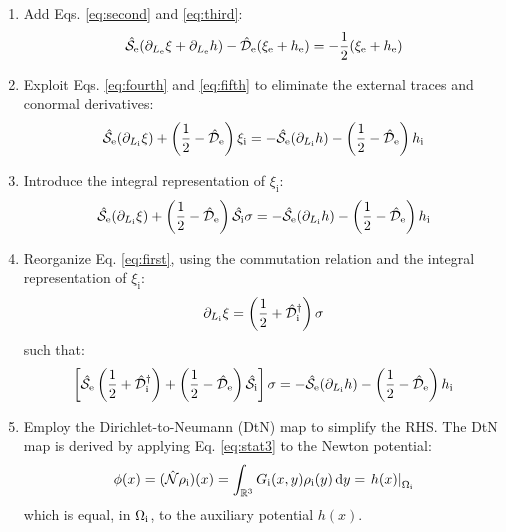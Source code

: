 \begin{enumerate}
  \item Add Eqs. \eqref{eq:second} and \eqref{eq:third}:
    \begin{equation}
    \hat{\mathcal{S}}_\mathrm{e}(\partial_{L_\mathrm{e}} \xi + \partial_{L_\mathrm{e}} h) -
    \hat{\mathcal{D}}_\mathrm{e}(\xi_\mathrm{e} + h_\mathrm{e})
    = -\frac{1}{2}(\xi_\mathrm{e} + h_\mathrm{e})
    \end{equation}
  \item Exploit Eqs. \eqref{eq:fourth} and \eqref{eq:fifth} to
    eliminate the external traces and conormal derivatives:
    \begin{equation}
      \hat{\mathcal{S}}_\mathrm{e}(\partial_{L_\mathrm{i}} \xi) + \left(\frac{1}{2} -
      \hat{\mathcal{D}}_\mathrm{e}\right)\xi_\mathrm{i} =
      - \hat{\mathcal{S}}_\mathrm{e}(\partial_{L_\mathrm{i}} h) - \left(\frac{1}{2} -
      \hat{\mathcal{D}}_\mathrm{e}\right)h_\mathrm{i}
    \end{equation}
  \item Introduce the integral representation of
    $\xi_\mathrm{i}$:
    \begin{equation}
      \hat{\mathcal{S}}_\mathrm{e}(\partial_{L_\mathrm{i}} \xi) + \left(\frac{1}{2} -
      \hat{\mathcal{D}}_\mathrm{e}\right)\hat{\mathcal{S}}_\mathrm{i}\sigma =
      - \hat{\mathcal{S}}_\mathrm{e}(\partial_{L_\mathrm{i}} h) - \left(\frac{1}{2} -
      \hat{\mathcal{D}}_\mathrm{e}\right)h_\mathrm{i}
    \end{equation}
  \item Reorganize Eq. \eqref{eq:first}, using the commutation
    relation and the integral representation of $\xi_\mathrm{i}$:
    \begin{equation}
    \partial_{L_\mathrm{i}} \xi = \left(\frac{1}{2} + \hat{\mathcal{D}}^\dagger_\mathrm{i}\right)\sigma
    \end{equation}
    such that:
    \begin{equation}
      \left[ \hat{\mathcal{S}}_\mathrm{e}\left(\frac{1}{2} + \hat{\mathcal{D}}^\dagger_\mathrm{i}\right)
      +
      \left(\frac{1}{2} - \hat{\mathcal{D}}_\mathrm{e}\right)\hat{\mathcal{S}}_\mathrm{i}
      \right]\sigma =
      - \hat{\mathcal{S}}_\mathrm{e}(\partial_{L_\mathrm{i}} h) - \left(\frac{1}{2} -
      \hat{\mathcal{D}}_\mathrm{e}\right)h_\mathrm{i}
    \end{equation}
  \item Employ the Dirichlet-to-Neumann (DtN) map to simplify
    the RHS. The DtN map is derived by applying Eq. \eqref{eq:stat3} to
    the Newton potential:
    \begin{equation}
      \phi(x) = (\hat{\mathcal{N}}\rho_\mathrm{i})(x) = \int_{\mathbb{R}^3}G_\mathrm{i}(x, y)\rho_\mathrm{i}(y)\mathop{}\!\mathrm{d} y
      = \left.h(x)\right|_{\Omega_\mathrm{i}}
    \end{equation}
    which is equal, in $\Omega_\mathrm{i}$, to the auxiliary potential $h(x)$.

\end{enumerate}
